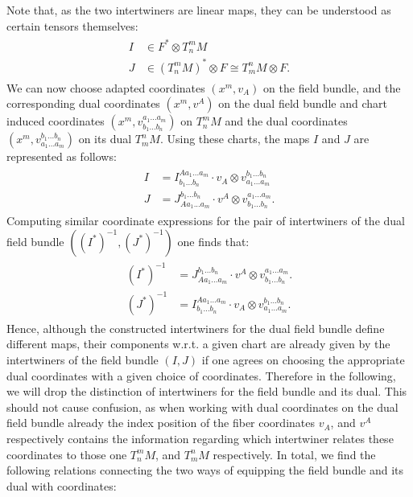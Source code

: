 Note that, as the two intertwiners are linear maps, they can be understood as certain tensors themselves: 
\begin{align}
\begin{aligned}
I &\in F^{\ast} \otimes T^m_n M\\
J &\in (T^m_nM)^{\ast} \otimes F \cong T^n_m M \otimes F.
\end{aligned}
\end{align}
We can now choose adapted coordinates $(x^m,v_A)$ on the field bundle, and the corresponding dual coordinates $(x^m, v^A)$ on the dual field bundle and chart induced coordinates $(x^m, v^{a_1 ... a_m}_{b_1 ... b_n})$ on $T^m_n M$ and the dual coordinates $(x^m, v^{b_1 ... b_n}_{a_1 ... a_m})$ on its dual $T^n_mM$. Using these charts, the maps $I$ and $J$ are represented as follows:
\begin{align} \label{interAbs}
    \begin{aligned}
    I &= I^{A a_1 ... a_m}_{b_1 ... b_n} \cdot v_A \otimes  v^{b_1 ... b_n}_{a_1 ... a_m}\\
    J &= J^{b_1 ... b_n}_{A a_1 ... a_m} \cdot v^A \otimes  v^{a_1 ... a_m}_{b_1 ... b_n}.
    \end{aligned}
\end{align}
Computing similar coordinate expressions for the pair of intertwiners of the dual field bundle $((I^{\ast})^{-1}, (J^{\ast})^{-1})$ one finds that:
\begin{align} \label{dualInterAbs}
    \begin{aligned}
         (I^{\ast})^{-1} &= J^{b_1 ... b_n}_{A a_1 ... a_m} \cdot v^A \otimes  v^{a_1 ... a_m}_{b_1 ... b_n}.\\
         (J^{\ast})^{-1} &= I^{A a_1 ... a_m}_{b_1 ... b_n} \cdot v_A \otimes  v^{b_1 ... b_n}_{a_1 ... a_m}.
    \end{aligned}
\end{align} 
Hence, although the constructed intertwiners for the dual field bundle define different maps, their components w.r.t. a given chart are already given by the intertwiners of the field bundle $(I,J)$ if one agrees on choosing the appropriate dual coordinates with a given choice of coordinates. Therefore in the following, we will drop the distinction of intertwiners for the field bundle and its dual.  This should not cause confusion, as when working with dual coordinates on the dual field bundle already the index position of the fiber coordinates $v_A$, and $v^{A}$ respectively contains the information regarding which intertwiner relates these coordinates to those one $T^m_n M$, and $T^n_mM$ respectively. In total, we find the following relations connecting the two ways of equipping the field bundle and its dual with coordinates: 
